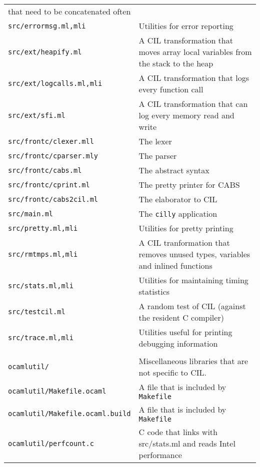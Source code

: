 \documentclass{article}
\def\t#1{{\tt #1}}
\begin{document}
\begin{tabular}{ll}
                                   that need to be concatenated often\\
\t{src/errormsg.ml,mli}         & Utilities for error reporting \\
\t{src/ext/heapify.ml}          & A CIL transformation that moves array local
                                   variables from the stack to the heap \\
\t{src/ext/logcalls.ml,mli}     & A CIL transformation that logs every
                                   function call \\
\t{src/ext/sfi.ml}              & A CIL transformation that can log every
                                   memory read and write \\
\t{src/frontc/clexer.mll}       & The lexer \\
\t{src/frontc/cparser.mly}      & The parser \\
\t{src/frontc/cabs.ml}          & The abstract syntax \\
\t{src/frontc/cprint.ml}        & The pretty printer for CABS \\
\t{src/frontc/cabs2cil.ml}      & The elaborator to CIL \\
\t{src/main.ml}                 & The \t{cilly} application \\
\t{src/pretty.ml,mli}           & Utilities for pretty printing \\
\t{src/rmtmps.ml,mli}           & A CIL tranformation that removes unused
                                  types, variables and inlined functions \\
\t{src/stats.ml,mli}            & Utilities for maintaining timing statistics
\\
\t{src/testcil.ml}              & A random test of CIL (against the resident 
                                  C compiler)\\
\t{src/trace.ml,mli}            & Utilities useful for printing debugging
                                   information\\
\\
\t{ocamlutil/}                  & Miscellaneous libraries that are not
                                  specific to CIL. \\
\t{ocamlutil/Makefile.ocaml}    & A file that is included by \t{Makefile} \\
\t{ocamlutil/Makefile.ocaml.build}& A file that is included by \t{Makefile} \\
\t{ocamlutil/perfcount.c}       & C code that links with src/stats.ml
                                  and reads Intel performance

\end{tabular}
\end{document}

